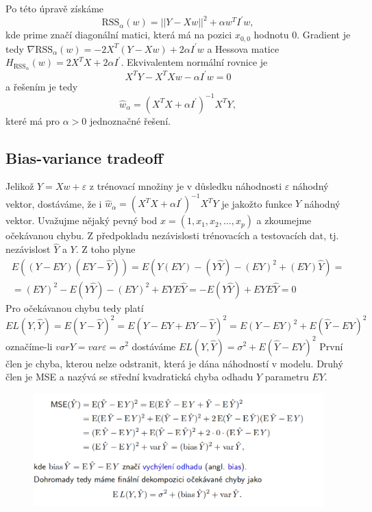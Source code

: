 \documentclass[12pt]{article}
\begin{document}
Po této úpravě získáme
\begin{equation}
\text{RSS}_\alpha (w)=||Y-Xw||^2+\alpha w^T I^\prime w,
\end{equation}
kde prime značí diagonální matici, která má na pozici $x_{0,0}$ hodnotu $0$. Gradient je tedy $\nabla \text{RSS}_\alpha(w)=-2X^T(Y-Xw)+2\alpha I^\prime w$ a Hessova matice $H_{\text{RSS}_\alpha}(w)=2X^TX+2\alpha I^\prime$. Ekvivalentem normální rovnice je 
\begin{equation}
X^TY-X^TXw-\alpha I^\prime w=0
\end{equation} a řešením je tedy 
\begin{equation}
\hat{w}_\alpha=(X^TX+\alpha I^\prime)^{-1} X^TY,
\end{equation}
které má pro $\alpha>0$ jednoznačné řešení.

\subsection{Bias-variance tradeoff}
Jelikož $Y=Xw+\varepsilon$ z trénovací množiny je v důsledku náhodnosti $\varepsilon$ náhodný vektor, dostáváme, že i $\hat{w}_\alpha=(X^TX+\alpha I^\prime)^{-1} X^TY$ je jakožto funkce $Y$ náhodný vektor. Uvažujme nějaký pevný bod $x=(1,x_1,x_2,\ldots,x_p)$ a zkoumejme očekávanou chybu. Z předpokladu nezávislosti trénovacích a testovacích dat, tj. nezávislost $\hat{Y}$ a $Y$. Z toho plyne
\begin{equation}
\begin{aligned}
E((Y-EY)(EY-\hat{Y}))=E(Y(EY)-(Y\hat{Y})-(EY)^2+(EY)\hat{Y})=\\=(EY)^2-E(Y\hat{Y})-(EY)^2+EYE\hat{Y}=-E(Y\hat{Y})+EYE\hat{Y}=0
\end{aligned}
\end{equation}
Pro očekávanou chybu tedy platí
\begin{equation}
EL(Y,\hat{Y})=E(Y-\hat{Y})^2=E(Y-EY+EY-\hat{Y})^2=E(Y-EY)^2+E(\hat{Y}-EY)^2
\end{equation}
označíme-li $varY=var\varepsilon=\sigma^2$ dostáváme $EL(Y,\hat{Y})=\sigma^2+E(\hat{Y}-EY)^2$
První člen je chyba, kterou nelze odstranit, která je dána náhodností v modelu. Druhý člen je MSE a nazývá se střední kvadratická chyba odhadu $Y$ parametru $EY$.
\begin{figure}
\includegraphics[width=\linewidth]{biasvariance}
\end{figure}
\end{document}
